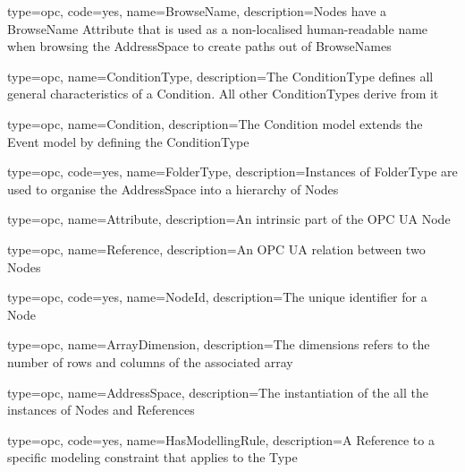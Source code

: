 {
  type=opc,
  code=yes,
  name=BrowseName,
  description={Nodes have a BrowseName Attribute that is used as a non-localised human-readable name when browsing the AddressSpace to create paths out of BrowseNames}
}

{
    type=opc,
    name=ConditionType,
    description={The ConditionType defines all general characteristics of a Condition. All other ConditionTypes derive from it}
}

{
    type=opc,
    name=Condition,
    description={The Condition model extends the Event model by defining the ConditionType}
}

{
  type=opc,
  code=yes,
  name=FolderType,
  description={Instances of FolderType are used to organise the AddressSpace into a hierarchy of Nodes}
}



{
  type=opc,
  name=Attribute,
  description={An intrinsic part of the OPC UA Node}
}

{
  type=opc,
  name=Reference,
  description={An OPC UA relation between two \glspl{Node}}
}

{
  type=opc,
  code=yes,
  name=NodeId,
  description={The unique identifier for a \gls{Node}}
}
  
{
  type=opc,
  name=ArrayDimension,
  description={The dimensions refers to the number of rows and columns of the associated array}
}

{
  type=opc,
  name=AddressSpace,
  description={The instantiation of the all the instances of \glspl{Node} and \glspl{Reference}}
}

{
  type=opc,
  code=yes,
  name=HasModellingRule,
  description={A \gls{Reference} to a specific modeling constraint that applies to the \gls{Type}}
}

